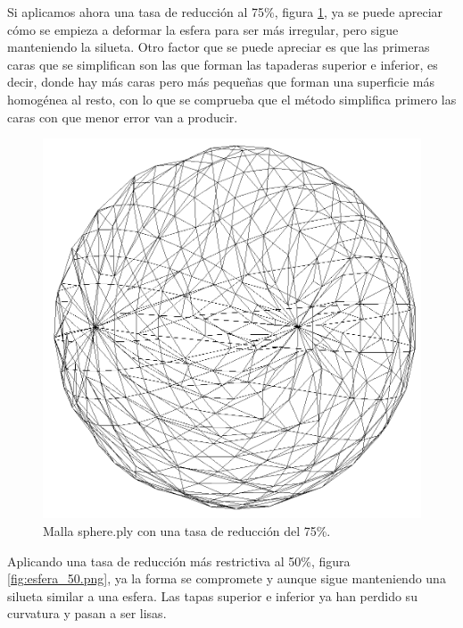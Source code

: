 Si aplicamos ahora una tasa de reducción al 75\%, figura \ref{fig:esfera_75.png}, ya se puede apreciar cómo se empieza a deformar la esfera para ser más irregular, pero sigue manteniendo la silueta. Otro factor que se puede apreciar es que las primeras caras que se simplifican son las que forman las tapaderas superior e inferior, es decir, donde hay más caras pero más pequeñas que forman una superficie más homogénea al resto, con lo que se comprueba que el método simplifica primero las caras con que menor error van a producir.\\

\begin{figure} %
	\centering
	\includegraphics[scale=0.25]{imagenes/esfera_75.png} 
	\caption{Malla sphere.ply con una tasa de reducción del 75\%.} \label{fig:esfera_75.png}
\end{figure}

Aplicando una tasa de reducción más restrictiva al 50\%, figura \ref{fig:esfera_50.png}, ya la forma se compromete y aunque sigue manteniendo una silueta similar a una esfera. Las tapas superior e inferior ya han perdido su curvatura y pasan a ser lisas.\\

